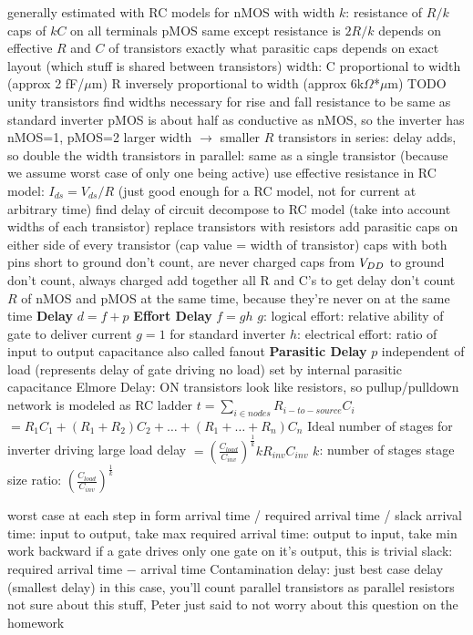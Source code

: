 \documentclass[12pt]{article}
\begin{document}
\begin{spacing}{0.8}
\begin{multicols*}{2}
\begin{flushleft}
\begin{outline}[longenum]
  \1 generally estimated with RC models
    \2 for nMOS with width $k$:
    \2 resistance of $R/k$
    \2 caps of $kC$ on all terminals
    \2 pMOS same except resistance is $2R/k$
  \1 depends on effective $R$ and $C$ of transistors 
    \2 exactly what parasitic caps depends on exact layout (which stuff is shared between transistors)
  \1 width:
    \2 C proportional to width
     (approx 2 fF/$\mu$m)
    \2 R inversely proportional to width
      (approx 6k$\Omega$*$\mu$m)
    \2 TODO unity transistors
  \1 find widths necessary for rise and fall resistance to be same as standard inverter
    \2 pMOS is about half as conductive as nMOS, so the inverter has nMOS=1, pMOS=2
    \2 larger width $\rightarrow$ smaller $R$
    \2 transistors in series: delay adds, so double the width
    \2 transistors in parallel: same as a single transistor (because we assume worst case of only one being active)
  \1 use effective resistance in RC model: $I_{ds}=V_{ds}/R$
    (just good enough for a RC model, not for current at arbitrary time)
  \1 find delay of circuit
    \2 decompose to RC model (take into account widths of each transistor)
      \3 replace transistors with resistors
      \3 add parasitic caps on either side of every transistor (cap value = width of transistor)
        \4 caps with both pins short to ground don't count, are never charged
        \4 caps from $V_{DD}$ to ground don't count, always charged
    \2 add together all R and C's to get delay
      \3 don't count $R$ of nMOS and pMOS at the same time, because they're never on at the same time
  \1 \textbf{Delay} $d=f+p$
  \1 \textbf{Effort Delay} $f = gh$
    \2 $g$: logical effort: relative ability of gate to deliver current
      \3 $g=1$ for standard inverter
    \2 $h$: electrical effort: ratio of input to output capacitance
      \3 also called fanout
  \1 \textbf{Parasitic Delay} $p$
    \2 independent of load (represents delay of gate driving no load)
    \2 set by internal parasitic capacitance
  \1 Elmore Delay:
    \2 ON transistors look like resistors, so pullup/pulldown network is modeled as RC ladder
    \2 $t = \sum_{i\in nodes} R_{i-to-source}C_i$
    $= R_1C_1 + (R_1+R_2)C_2+\ldots+(R_1+\ldots+R_n)C_n$
  \1 Ideal number of stages for inverter driving large load
    \2 delay $ = \left( \frac{C_{load}}{C_{inv}} \right) ^\frac{1}{k} k R_{inv} C_{inv}$
    \2 $k$: number of stages
    \2 stage size ratio: $\left( \frac{C_{load}}{C_{inv}} \right) ^\frac{1}{k}$

  \1 worst case at each step
  \1 in form arrival time / required arrival time / slack
  \1 arrival time: input to output, take max
  \1 required arrival time: output to input, take min
    \2 work backward
    \2 if a gate drives only one gate on it's output, this is trivial
  \1 slack: required arrival time $-$ arrival time
  \1 Contamination delay: just best case delay (smallest delay)
    \2 in this case, you'll count parallel transistors as parallel resistors
  \1 not sure about this stuff, Peter just said to not worry about this question on the homework


\end{outline}
\end{flushleft}
\end{multicols*}
\end{spacing}
\end{document}
